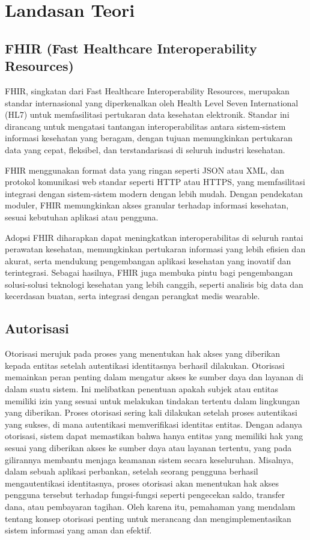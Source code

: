 \chapter{Landasan Teori}

\section{FHIR (Fast Healthcare Interoperability Resources)}
FHIR, singkatan dari Fast Healthcare Interoperability Resources, merupakan standar internasional yang diperkenalkan oleh Health Level Seven International (HL7) untuk memfasilitasi pertukaran data kesehatan elektronik. Standar ini dirancang untuk mengatasi tantangan interoperabilitas antara sistem-sistem informasi kesehatan yang beragam, dengan tujuan memungkinkan pertukaran data yang cepat, fleksibel, dan terstandarisasi di seluruh industri kesehatan. 

FHIR menggunakan format data yang ringan seperti JSON atau XML, dan protokol komunikasi web standar seperti HTTP atau HTTPS, yang memfasilitasi integrasi dengan sistem-sistem modern dengan lebih mudah. Dengan pendekatan moduler, FHIR memungkinkan akses granular terhadap informasi kesehatan, sesuai kebutuhan aplikasi atau pengguna. 

Adopsi FHIR diharapkan dapat meningkatkan interoperabilitas di seluruh rantai perawatan kesehatan, memungkinkan pertukaran informasi yang lebih efisien dan akurat, serta mendukung pengembangan aplikasi kesehatan yang inovatif dan terintegrasi. Sebagai hasilnya, FHIR juga membuka pintu bagi pengembangan solusi-solusi teknologi kesehatan yang lebih canggih, seperti analisis big data dan kecerdasan buatan, serta integrasi dengan perangkat medis wearable.

\section{Autorisasi}
Otorisasi merujuk pada proses yang menentukan hak akses yang diberikan kepada entitas setelah autentikasi identitasnya berhasil dilakukan. Otorisasi memainkan peran penting dalam mengatur akses ke sumber daya dan layanan di dalam suatu sistem. Ini melibatkan penentuan apakah subjek atau entitas memiliki izin yang sesuai untuk melakukan tindakan tertentu dalam lingkungan yang diberikan. Proses otorisasi sering kali dilakukan setelah proses autentikasi yang sukses, di mana autentikasi memverifikasi identitas entitas. Dengan adanya otorisasi, sistem dapat memastikan bahwa hanya entitas yang memiliki hak yang sesuai yang diberikan akses ke sumber daya atau layanan tertentu, yang pada gilirannya membantu menjaga keamanan sistem secara keseluruhan. Misalnya, dalam sebuah aplikasi perbankan, setelah seorang pengguna berhasil mengautentikasi identitasnya, proses otorisasi akan menentukan hak akses pengguna tersebut terhadap fungsi-fungsi seperti pengecekan saldo, transfer dana, atau pembayaran tagihan. Oleh karena itu, pemahaman yang mendalam tentang konsep otorisasi penting untuk merancang dan mengimplementasikan sistem informasi yang aman dan efektif.

